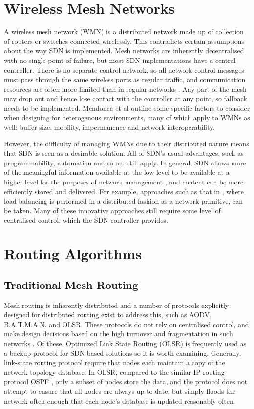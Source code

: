 \section{Wireless Mesh Networks}
A wireless mesh network (WMN) is a distributed network made up of collection of routers or switches connected wirelessly.
This contradicts certain assumptions about the way SDN is implemented. Mesh networks are inherently decentralised with no single point of failure, but most SDN implementations have a central controller. There is no separate control network, so all network control messages must pass through the same wireless ports as regular traffic, and communication resources are often more limited than in regular networks \cite{detti:wmsdn}. Any part of the mesh may drop out and hence lose contact with the controller at any point, so fallback needs to be implemented. Mendonca et al \cite{mendonca:hetero} outline some specific factors to consider when designing for heterogenous environments, many of which apply to WMNs as well: buffer size, mobility, impermanence and network interoperability.

However, the difficulty of managing WMNs due to their distributed nature means that SDN is seen as a desirable solution. All of SDN's usual advantages, such as programmability, automation and so on, still apply. In general, SDN allows more of the meaningful information available at the low level to be available at a higher level for the purposes of network management \cite{mendonca:hetero, dely:wmn}, and content can be more efficiently stored and delivered. For example, approaches such as that in \cite{handigol:asterix}, where load-balancing is performed in a distributed fashion as a network primitive, can be taken. Many of these innovative approaches still require some level of centralised control, which the SDN controller provides.

\section{Routing Algorithms}
\subsection{Traditional Mesh Routing}
Mesh routing is inherently distributed and a number of protocols explicitly designed for distributed routing exist to address this, such as AODV, B.A.T.M.A.N. and OLSR. These protocols do not rely on centralised control, and make design decisions based on the high turnover and fragmentation in such networks \cite{dely:wmn, detti:wmsdn}. Of these, Optimized Link State Routing (OLSR) \cite{rfc3626} is frequently used as a backup protocol for SDN-based solutions so it is worth examining. Generally, link-state routing protocol require that nodes each maintain a copy of the network topology database. In OLSR, compared to the similar IP routing protocol OSPF \cite{rfc5340}, only a subset of nodes store the data, and the protocol does not attempt to ensure that all nodes are always up-to-date, but simply floods the network often enough that each node's database is updated reasonably often.

